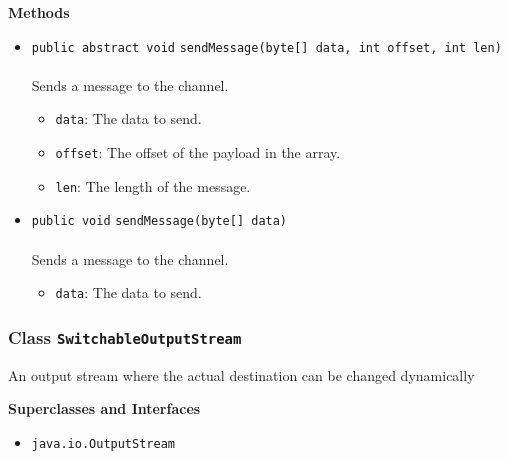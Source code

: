 \textbf{\sffamily Methods}
\begin{itemize}
\item \lstinline|public abstract void| \lstinline|sendMessage|\lstinline|(byte[] data, int offset, int len)|\\ \\[-0.6em]
Sends a message to the channel.
\begin{itemize}
\item \lstinline|data|: The data to send.
\item \lstinline|offset|: The offset of the payload in the array.
\item \lstinline|len|: The length of the message.
\end{itemize}



\item \lstinline|public void| \lstinline|sendMessage|\lstinline|(byte[] data)|\\ \\[-0.6em]
Sends a message to the channel.
\begin{itemize}
\item \lstinline|data|: The data to send.
\end{itemize}



\end{itemize}

\subsubsection{Class \lstinline|SwitchableOutputStream|}
An output stream where the actual destination can be changed dynamically \\
\noindent\begin{minipage}[t]{5cm}
\vspace{0.3em}
\hspace*{2em}
\vspace{0.3em}
\end{minipage}



\textbf{\sffamily Superclasses and Interfaces}
\begin{itemize}
\item \lstinline|java.io.OutputStream|
\end{itemize}



